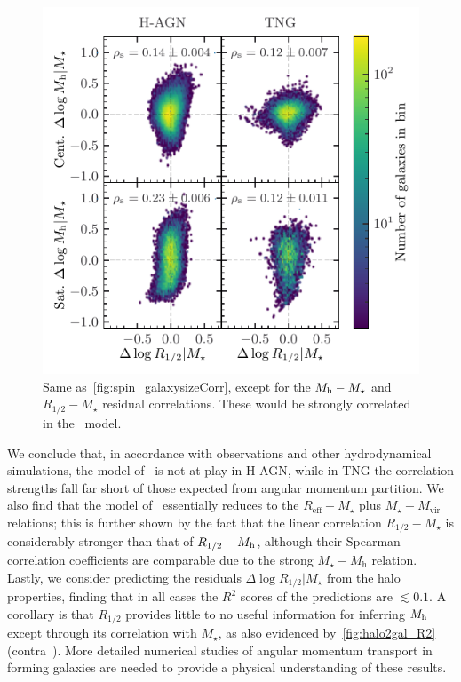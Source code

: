 \documentclass[useAMS,usenatbib]{mnras}
\begin{document}
\begin{figure}
    \centering
    \includegraphics[width=\columnwidth]{Figures/Reff_residuals_corr.pdf}
    \caption{Same as~\cref{fig:spin_galaxysizeCorr}, except for the $M_{\rm h}-M_\star$ and $R_{1/2}-M_\star$ residual correlations. These would be strongly correlated in the~\citet{Kravtsov_2013} model.}
    \label{fig:MvirMstarReff_corr}
\end{figure}



We conclude that, in accordance with observations and other hydrodynamical simulations, the model of~\citeauthor{MMW_1998} is not at play in H-AGN, while in TNG the correlation strengths fall far short of those expected from angular momentum partition. We also find that the model of~\citeauthor{Kravtsov_2013} essentially reduces to the $R_\text{eff}-M_\star$ plus $M_\star-M_\text{vir}$ relations; this is further shown by the fact that the linear correlation $R_{1/2} - M_\star$ is considerably stronger than that of $R_{1/2} - M_{\rm h}$, although their Spearman correlation coefficients are comparable due to the strong $M_\star-M_\text{h}$ relation. Lastly, we consider predicting the residuals $\Delta \log R_{1/2}|M_\star$ from the halo properties, finding that in all cases the $R^2$ scores of the predictions are $\lesssim 0.1$. A corollary is that $R_{1/2}$ provides little to no useful information for inferring $M_{\rm h}$ except through its correlation with $M_\star$, as also evidenced by~\cref{fig:halo2gal_R2} (contra~\citealt{Rohr}). More detailed numerical studies of angular momentum transport in forming galaxies are needed to provide a physical understanding of these results.
\end{document}
